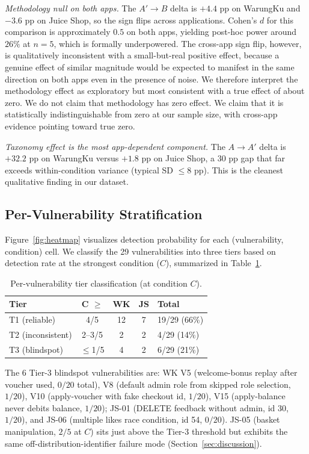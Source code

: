 \documentclass[conference]{IEEEtran}
\begin{document}
\emph{Methodology null on both apps.} The $A' \to B$ delta is $+4.4$ pp on WarungKu and $-3.6$ pp on Juice Shop, so the sign flips across applications. Cohen's $d$ for this comparison is approximately $0.5$ on both apps, yielding post-hoc power around $26\%$ at $n=5$, which is formally underpowered. The cross-app sign flip, however, is qualitatively inconsistent with a small-but-real positive effect, because a genuine effect of similar magnitude would be expected to manifest in the same direction on both apps even in the presence of noise. We therefore interpret the methodology effect as exploratory but most consistent with a true effect of about zero. We do not claim that methodology has zero effect. We claim that it is statistically indistinguishable from zero at our sample size, with cross-app evidence pointing toward true zero.

\emph{Taxonomy effect is the most app-dependent component.} The $A \to A'$ delta is $+32.2$ pp on WarungKu versus $+1.8$ pp on Juice Shop, a $30$ pp gap that far exceeds within-condition variance (typical SD $\le 8$ pp). This is the cleanest qualitative finding in our dataset.

\subsection{Per-Vulnerability Stratification}

Figure~\ref{fig:heatmap} visualizes detection probability for each (vulnerability, condition) cell. We classify the 29 vulnerabilities into three tiers based on detection rate at the strongest condition ($C$), summarized in Table~\ref{tab:tiers}.

\begin{table}[t]
\centering
\caption{Per-vulnerability tier classification (at condition $C$).}
\label{tab:tiers}
\begin{tabular}{lcccl}
\toprule
\textbf{Tier} & \textbf{C $\ge$} & \textbf{WK} & \textbf{JS} & \textbf{Total} \\
\midrule
T1 (reliable)      & 4/5 & 12 & 7 & 19/29 (66\%) \\
T2 (inconsistent)  & 2--3/5 &  2 & 2 &  4/29 (14\%) \\
T3 (blindspot)     & $\le$1/5 &  4 & 2 &  6/29 (21\%) \\
\bottomrule
\end{tabular}
\end{table}

\label{sec:tier3}
The $6$ Tier-3 blindspot vulnerabilities are: WK V5 (welcome-bonus replay after voucher used, $0/20$ total), V8 (default admin role from skipped role selection, $1/20$), V10 (apply-voucher with fake checkout id, $1/20$), V15 (apply-balance never debits balance, $1/20$); JS-01 (DELETE feedback without admin, id 30, $1/20$), and JS-06 (multiple likes race condition, id 54, $0/20$). JS-05 (basket manipulation, $2/5$ at $C$) sits just above the Tier-3 threshold but exhibits the same off-distribution-identifier failure mode (Section~\ref{sec:discussion}).
\end{document}
